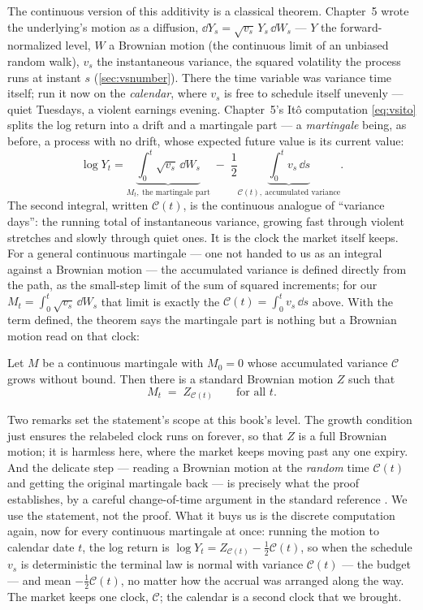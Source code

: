 The continuous version of this additivity is a classical theorem.
Chapter~5 wrote the underlying's motion as a diffusion,
$\dd Y_s=\sqrt{v_s}\,Y_s\,\dd W_s$ --- $Y$ the forward-normalized
level, $W$ a Brownian motion (the continuous limit of an unbiased
random walk), $v_s$ the instantaneous variance, the squared
volatility the process runs at instant $s$ (\cref{sec:vsnumber}).
There the time variable was variance time itself; run it now on the
\emph{calendar}, where $v_s$ is free to schedule itself unevenly ---
quiet Tuesdays, a violent earnings evening.  Chapter~5's It\^o
computation \eqref{eq:vsito} splits the log return into a drift and a
martingale part --- a \emph{martingale} being, as before, a process
with no drift, whose expected future value is its current value:
\[
\log Y_t
=\underbrace{\int_0^{t}\sqrt{v_s}\,\dd W_s}_{\textstyle M_t,
\ \text{the martingale part}}
\;-\;\frac12\underbrace{\int_0^{t}v_s\,\dd s}_{\textstyle
\mathcal{C}(t),\ \text{accumulated variance}} .
\]
The second integral, written $\mathcal{C}(t)$, is the continuous
analogue of ``variance days'': the running total of instantaneous
variance, growing fast through violent stretches and slowly through
quiet ones.  It is the clock the market itself keeps.  For a general
continuous martingale --- one not handed to us as an integral against
a Brownian motion --- the accumulated variance is defined directly
from the path, as the small-step limit of the sum of squared
increments; for our $M_t=\int_0^t\sqrt{v_s}\,\dd W_s$ that limit is
exactly the $\mathcal{C}(t)=\int_0^t v_s\,\dd s$ above.  With the
term defined, the theorem says the martingale part is nothing but a
Brownian motion read on that clock:

\begin{theorem}
\label{thm:clkdds}
Let $M$ be a continuous martingale with $M_0=0$ whose accumulated
variance $\mathcal{C}$ grows without bound.  Then there is a standard
Brownian motion $Z$ such that
\[
M_t \;=\; Z_{\mathcal{C}(t)}\qquad\text{for all }t .
\]
\end{theorem}

Two remarks set the statement's scope at this book's level.  The
growth condition just ensures the relabeled clock runs on forever, so
that $Z$ is a full Brownian motion; it is harmless here, where the
market keeps moving past any one expiry.  And the delicate step ---
reading a Brownian motion at the \emph{random} time $\mathcal{C}(t)$
and getting the original martingale back --- is precisely what the
proof establishes, by a careful change-of-time argument in the
standard reference \citep[Ch.~V]{RevuzYor1999}.  We use the
statement, not the proof.
What it buys us is the discrete computation again, now for every
continuous martingale at once: running the motion to calendar date
$t$, the log return is
$\log Y_t=Z_{\mathcal{C}(t)}-\tfrac12\mathcal{C}(t)$, so when the
schedule $v_s$ is deterministic the terminal law is normal with
variance $\mathcal{C}(t)$ --- the budget --- and mean
$-\tfrac12\mathcal{C}(t)$, no matter how the accrual was arranged
along the way.  The market keeps one clock, $\mathcal{C}$; the
calendar is a second clock that we brought.

